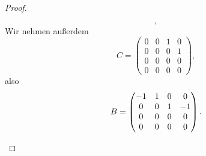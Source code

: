 \begin{proof}
\begin{parts}
\[,\] 
Wir nehmen außerdem 
\[
	C=\begin{pmatrix}  0 & 0 & 1 & 0 \\ 0 & 0 & 0 & 1\\ 0 & 0 & 0 & 0 \\ 0 & 0 & 0 & 0 \end{pmatrix} 
,\] 
also
\[
	B=\begin{pmatrix} -1 & 1 & 0 & 0\\0 & 0 &1 & -1\\ 0 & 0 & 0 & 0 \\ 0 & 0 & 0 & 0 \end{pmatrix} 
.\qedhere\] 
\end{parts}
\end{proof}
